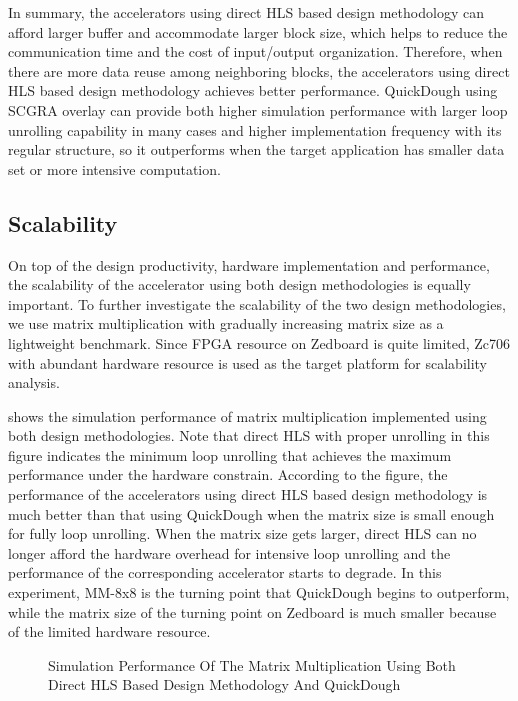 In summary, the accelerators using direct HLS based design methodology can afford larger buffer and accommodate larger block size, which helps to reduce the communication time and the cost of input/output organization. Therefore, when there are more data reuse among neighboring blocks, the accelerators using direct HLS based design methodology achieves better performance. QuickDough using SCGRA overlay can provide both higher simulation performance with larger loop unrolling capability in many cases and higher implementation frequency with its regular structure, so it outperforms when the target application has smaller data set or more intensive computation.  

  
\subsection{Scalability}
On top of the design productivity, hardware implementation and performance, the scalability of the accelerator using both design methodologies is equally important. To further investigate the scalability of the two design methodologies, we use matrix multiplication with gradually increasing matrix size as a lightweight benchmark. Since FPGA resource on Zedboard is quite limited, Zc706 with abundant hardware resource is used as the target platform for scalability analysis. 

 shows the simulation performance of matrix multiplication implemented using both design methodologies. Note that direct HLS with proper unrolling in this figure indicates the minimum loop unrolling that achieves the maximum performance under the hardware constrain. According to the figure, the performance of the accelerators using direct HLS based design methodology is much better than that using QuickDough when the matrix size is small enough for fully loop unrolling. When the matrix size gets larger, direct HLS can no longer afford the hardware overhead for intensive loop unrolling and the performance of the corresponding accelerator starts to degrade. In this experiment, MM-8x8 is the turning point that QuickDough begins to outperform, while the matrix size of the turning point on Zedboard is much smaller because of the limited hardware resource.

\begin{figure}[htpb]
\centering



\caption{Simulation Performance Of The Matrix Multiplication Using Both Direct HLS Based Design Methodology And QuickDough}
\label{fig:mm-sim-perf}

\end{figure}

